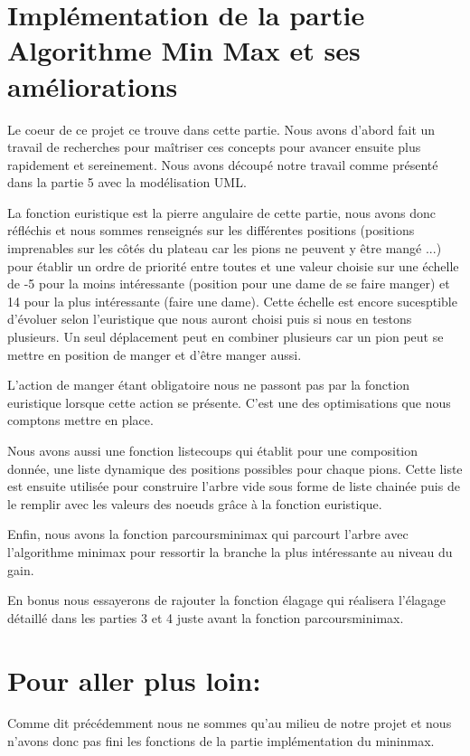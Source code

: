 \documentclass[12,french]{report}
\begin{document}
\section{Implémentation de la partie Algorithme Min Max et ses améliorations}

Le coeur de ce projet ce trouve dans cette partie. Nous avons d'abord
fait un travail de recherches pour maîtriser ces concepts pour avancer
ensuite plus rapidement et sereinement. Nous avons découpé notre travail
comme présenté dans la partie 5 avec la modélisation UML.

La fonction euristique est la pierre angulaire de cette partie, nous
avons donc réfléchis et nous sommes renseignés sur les différentes
positions (positions imprenables sur les côtés du plateau car les
pions ne peuvent y être mangé ...) pour établir un ordre de priorité
entre toutes et une valeur choisie sur une échelle de -5 pour la moins
intéressante (position pour une dame de se faire manger) et 14 pour
la plus intéressante (faire une dame). Cette échelle est encore sucesptible
d'évoluer selon l'euristique que nous auront choisi puis si nous en
testons plusieurs. Un seul déplacement peut en combiner plusieurs
car un pion peut se mettre en position de manger et d'être manger
aussi.

L'action de manger étant obligatoire nous ne passont pas par la fonction
euristique lorsque cette action se présente. C'est une des optimisations
que nous comptons mettre en place.

Nous avons aussi une fonction listecoups qui établit pour une composition
donnée, une liste dynamique des positions possibles pour chaque pions.
Cette liste est ensuite utilisée pour construire l'arbre vide sous
forme de liste chainée puis de le remplir avec les valeurs des noeuds
grâce à la fonction euristique.

Enfin, nous avons la fonction parcoursminimax qui parcourt l'arbre
avec l'algorithme minimax pour ressortir la branche la plus intéressante
au niveau du gain.

En bonus nous essayerons de rajouter la fonction élagage qui réalisera
l'élagage détaillé dans les parties 3 et 4 juste avant la fonction
parcoursminimax.

\section{Pour aller plus loin:}

Comme dit précédemment nous ne sommes qu'au milieu de notre projet
et nous n'avons donc pas fini les fonctions de la partie implémentation
du mininmax.
\end{document}

